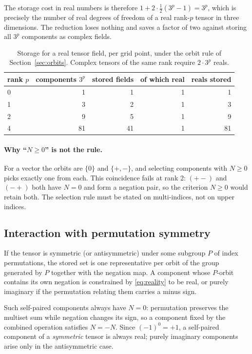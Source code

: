 \documentclass[11pt,a4paper]{article}
\begin{document}
The storage cost in real numbers is therefore
$1 + 2 \cdot \tfrac{1}{2}(3^p - 1) = 3^p$, which is precisely the number
of real degrees of freedom of a real rank-$p$ tensor in three
dimensions.  The reduction loses nothing and saves a factor of two
against storing all $3^p$ components as complex fields.

\begin{table}[h]
  \centering
  \begin{tabular}{lrrrr}
    \toprule
    rank $p$ & components $3^p$ & stored fields & of which real & reals stored \\
    \midrule
    0 & 1  & 1  & 1 & 1 \\
    1 & 3  & 2  & 1 & 3 \\
    2 & 9  & 5  & 1 & 9 \\
    4 & 81 & 41 & 1 & 81 \\
    \bottomrule
  \end{tabular}
  \caption{Storage for a real tensor field, per grid point, under the
    orbit rule of Section~\ref{sec:orbits}.  Complex tensors of the same
    rank require $2 \cdot 3^p$ reals.}
  \label{tab:storage}
\end{table}

\paragraph{Why ``$N \geq 0$'' is not the rule.}  For a vector the orbits
are $\{0\}$ and $\{+,-\}$, and selecting components with $N \geq 0$ picks
exactly one from each.  This coincidence fails at rank 2: $(+-)$ and
$(-+)$ both have $N = 0$ and form a negation pair, so the criterion
$N \geq 0$ would retain both.  The selection rule must be stated on
multi-indices, not on upper indices.

\subsection{Interaction with permutation symmetry}
\label{sec:symmetry}

If the tensor is symmetric (or antisymmetric) under some subgroup $P$ of
index permutations, the stored set is one representative per orbit of the
group generated by $P$ together with the negation map.  A component whose
$P$-orbit contains its own negation is constrained by \eqref{eq:reality}
to be real, or purely imaginary if the permutation relating them carries
a minus sign.

Such self-paired components always have $N = 0$: permutation preserves
the multiset sum while negation changes its sign, so a component fixed by
the combined operation satisfies $N = -N$.  Since $(-1)^{0} = +1$, a
self-paired component of a \emph{symmetric} tensor is always real; purely
imaginary components arise only in the antisymmetric case.
\end{document}
